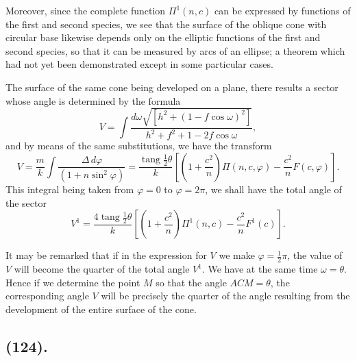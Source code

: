 \documentclass{article}
\begin{document}
Moreover, since the complete function $\Pi^{1}(n,c)$ can be expressed by functions of the first and second species, we see that the surface of the oblique cone with circular base likewise depends only on the elliptic functions of the first and second species, so that it can be measured by arcs of an ellipse; a theorem which had not yet been demonstrated except in some particular cases.

The surface of the same cone being developed on a plane, there results a sector whose angle is determined by the formula
\[ V=\int\frac{d\omega\sqrt{[h^{2}+(1-f\cos\omega)^{2}]}}{h^{2}+f^{2}+1-2f\cos\omega}, \]
and by means of the same substitutions, we have the transform
\[ V=\frac{m}{k}\int\frac{\Delta\,d\varphi}{(1+n\sin^{2}\varphi)}=\frac{\operatorname{tang}\tfrac{1}{2}\theta}{k}\left[\left(1+\frac{c^{2}}{n}\right)\Pi(n,c,\varphi)-\frac{c^{2}}{n}F(c,\varphi)\right]. \]
This integral being taken from $\varphi=0$ to $\varphi=2\pi$, we shall have the total angle of the sector
\[ V^{1}=\frac{4\operatorname{tang}\tfrac{1}{2}\theta}{k}\left[\left(1+\frac{c^{2}}{n}\right)\Pi^{1}(n,c)-\frac{c^{2}}{n}F^{1}(c)\right]. \]

It may be remarked that if in the expression for $V$ we make $\varphi=\frac{1}{2}\pi$, the value of $V$ will become the quarter of the total angle $V^{1}$. We have at the same time $\omega=\theta$. Hence if we determine the point $M$ so that the angle $ACM=\theta$, the corresponding angle $V$ will be precisely the quarter of the angle resulting from the development of the entire surface of the cone.

\subsection*{(124).}
\end{document}
